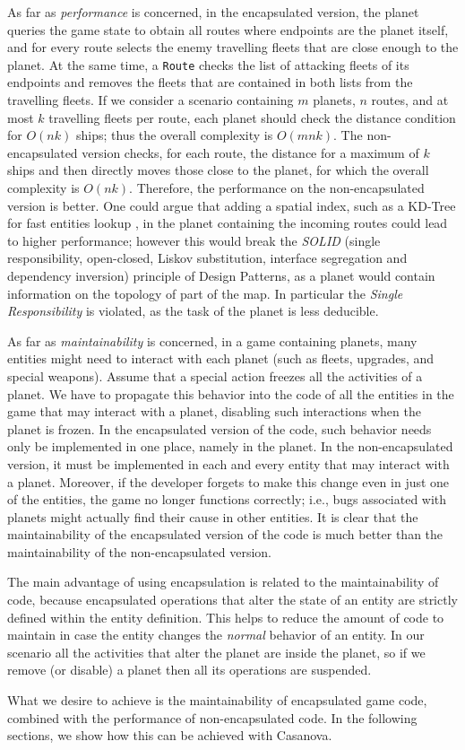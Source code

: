 As far as \emph{performance} is concerned, in the encapsulated version, the planet queries the game state to obtain all routes where endpoints are the planet itself, and for every route selects the enemy travelling fleets that are close enough to the planet. At the same time, a \texttt{Route} checks the list of attacking fleets of its endpoints and removes the fleets that are contained in both lists from the travelling fleets. If we consider a scenario containing $m$ planets, $n$ routes, and at most $k$ travelling fleets per route, each planet should check the distance condition for $O(nk)$ ships; thus the overall complexity is $O(mnk)$. The non-encapsulated version checks, for each route, the distance for a maximum of $k$ ships and then directly moves those close to the planet, for which the overall complexity is $O(nk)$. Therefore, the performance on the non-encapsulated version is better. One could argue that adding a spatial index, such as a KD-Tree for fast entities lookup \cite{white2007scaling}, in the planet containing the incoming routes could lead to higher performance; however this would break the \textit{SOLID} (single responsibility, open-closed, Liskov substitution, interface segregation and dependency inversion) principle of Design Patterns, as a planet would contain information on the topology of part of the map. In particular the \textit{Single Responsibility} is violated, as the task of the planet is less deducible.

As far as \emph{maintainability} is concerned, in a game containing planets, many entities might need to interact with each planet (such as fleets, upgrades, and special weapons). Assume that a special action freezes all the activities of a planet. We have to propagate this behavior into the code of all the entities in the game that may interact with a planet, disabling such interactions when the planet is frozen. In the encapsulated version of the code, such behavior needs only be implemented in one place, namely in the planet. In the non-encapsulated version, it must be implemented in each and every entity that may interact with a planet. Moreover, if the developer forgets to make this change even in just one of the entities, the game no longer functions correctly; i.e., bugs associated with planets might actually find their cause in other entities. It is clear that the maintainability of the encapsulated version of the code is much better than the maintainability of the non-encapsulated version.

The main advantage of using encapsulation is related to the maintainability of code, because encapsulated operations that alter the state of an entity are strictly defined within the entity definition. This helps to reduce the amount of code to maintain in case the entity changes the \textit{normal} behavior of an entity. In our scenario all the activities that alter the planet are inside the planet, so if we remove (or disable) a planet then all its operations are suspended.

What we desire to achieve is the maintainability of encapsulated game code, combined with the performance of non-encapsulated code. In the following sections, we show how this can be achieved with Casanova. 